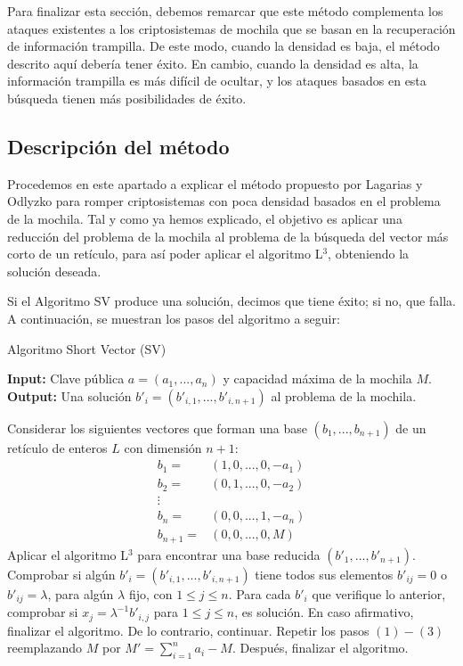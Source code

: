     Para finalizar esta sección, debemos remarcar que este método complementa los ataques existentes a los criptosistemas de mochila que se basan en la recuperación de información trampilla. De este modo, cuando la densidad es baja, el método descrito aquí debería tener éxito. En cambio, cuando la densidad es alta, la información trampilla es más difícil de ocultar, y los ataques basados en esta búsqueda tienen más posibilidades de éxito.

    \subsection{Descripción del método}

    Procedemos en este apartado a explicar el método propuesto por Lagarias y Odlyzko para romper criptosistemas con poca densidad basados en el problema de la mochila. Tal y como ya hemos explicado, el objetivo es aplicar una reducción del problema de la mochila al problema de la búsqueda del vector más corto de un retículo, para así poder aplicar el algoritmo L$^{3}$, obteniendo la solución deseada. 
    
    Si el Algoritmo SV produce una solución, decimos que tiene éxito; si no, que falla. A continuación, se muestran los pasos del algoritmo a seguir:

    \begin{algorithm}[H]
        \caption{Algoritmo Short Vector (SV)}
        \textbf{Input:} Clave pública $a = (a_{1}, ... , a_{n})$ y capacidad máxima de la mochila $M$.\\
        \textbf{Output:} Una solución $b'_{i} = (b'_{i,1}, ... , b'_{i,n+1})$ al problema de la mochila.
        \bigskip
        \begin{algorithmic}[1]
            \State Considerar los siguientes vectores que forman una base $(b_{1}, ... , b_{n+1})$ de un retículo de enteros $L$ con dimensión $n+1$:
            \begin{align}
                b_{1} =& (1, 0, ... , 0, -a_{1}) \\
                b_{2} =& (0, 1, ... , 0, -a_{2}) \\
                \vdots&                          \\
                b_{n} =& (0, 0, ... , 1, -a_{n}) \\
                b_{n+1} =& (0, 0, ... , 0, M)
            \end{align}
            \State Aplicar el algoritmo L$^{3}$ para encontrar una base reducida $(b'_{1}, ... , b'_{n+1})$.
            \State Comprobar si algún $b'_{i} = (b'_{i,1}, ... , b'_{i,n+1})$ tiene todos sus elementos $b'_{ij} = 0$ o $b'_{ij} = \lambda$, para algún $\lambda$ fijo, con $1 \leq j \leq n$. Para cada $b'_{i}$ que verifique lo anterior, comprobar si $x_{j} = \lambda^{-1} b'_{i,j}$ para $1 \leq j \leq n$, es solución. En caso afirmativo, finalizar el algoritmo. De lo contrario, continuar.
            \State Repetir los pasos $(1)-(3)$ reemplazando $M$ por $M' = \sum_{i=1}^{n} a_{i} - M$. Después, finalizar el algoritmo.
        \end{algorithmic}
    \end{algorithm}

